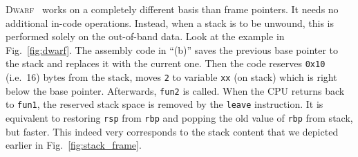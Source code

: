 \documentclass[10pt]{llncs}
\newcommand{\code}[2][]{\lstinline[columns=fullflexible, #1]$#2$}
\newcommand{\codeasm}[2][]{\code[language={[x86masm]Assembler},
	morekeywords={rbp,rsp},#1]{#2}}
\newcommand{\dwarf}{\textsc{Dwarf}\xspace}
\begin{document}
\dwarf~\cite{dwarf} works on a completely different basis than frame pointers.
It needs no additional in-code operations.  Instead, when a stack is to be
unwound, this is performed solely on the out-of-band data. Look at the example
in Fig.~\ref{fig:dwarf}.  The assembly code in ``(b)'' saves the previous base
pointer to the stack and replaces it with the current one. Then the code
reserves \code{0x10} (i.e.\ 16) bytes from the stack, moves \code{2} to
variable \code{xx} (on stack) which is right below the base pointer.
Afterwards, \code{fun2} is called. When the CPU returns back to \code{fun1},
the reserved stack space is removed by the \codeasm{leave} instruction. It is
equivalent to restoring \codeasm{rsp} from \codeasm{rbp} and popping the old
value of \codeasm{rbp} from stack, but faster. This indeed very corresponds to
the stack content that we depicted earlier in Fig.~\ref{fig:stack_frame}.
\end{document}
